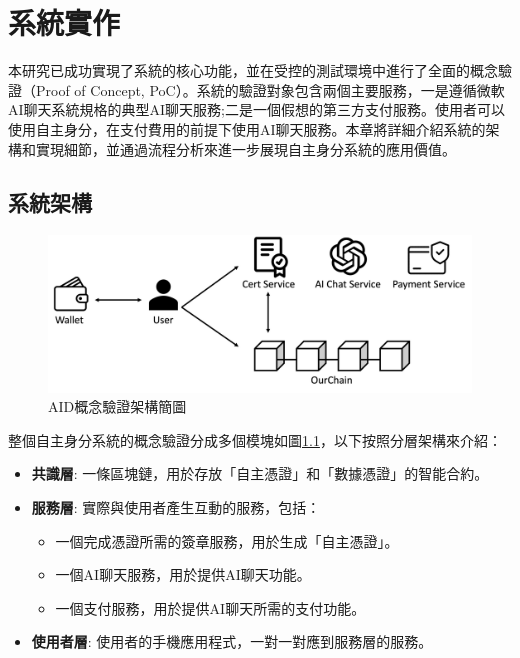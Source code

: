 
\chapter{系統實作}
本研究已成功實現了系統的核心功能，並在受控的測試環境中進行了全面的概念驗證（Proof of Concept, PoC）。系統的驗證對象包含兩個主要服務，一是遵循微軟AI聊天系統規格\cite{microsoft_ai_chat_protocol}的典型AI聊天服務;二是一個假想的第三方支付服務。使用者可以使用自主身分，在支付費用的前提下使用AI聊天服務。本章將詳細介紹系統的架構和實現細節，並通過流程分析來進一步展現自主身分系統的應用價值。
\section{系統架構}
\begin{figure}
  \centering
  \includegraphics[width=\linewidth, keepaspectratio]{figures/implement.png}
  \caption{AID概念驗證架構簡圖}
  \label{fig:implement}
\end{figure}
整個自主身分系統的概念驗證分成多個模塊如圖\ref{fig:implement}，以下按照分層架構來介紹：
\begin{itemize}
  \item \textbf{共識層}: 一條區塊鏈，用於存放「自主憑證」和「數據憑證」的智能合約。
  \item \textbf{服務層}: 實際與使用者產生互動的服務，包括：
        \begin{itemize}
          \item 一個完成憑證所需的簽章服務，用於生成「自主憑證」。
          \item 一個AI聊天服務，用於提供AI聊天功能。
          \item 一個支付服務，用於提供AI聊天所需的支付功能。
        \end{itemize}
  \item \textbf{使用者層}: 使用者的手機應用程式，一對一對應到服務層的服務。
\end{itemize}
